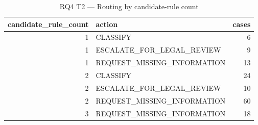 \begin{table}
\caption{RQ4 T2 — Routing by candidate-rule count}
\label{tab:rq4_t2_routing_by_rule_count}
\begin{tabular}{rlr}
\toprule
candidate\_rule\_count & action & cases \\
\midrule
1 & CLASSIFY & 6 \\
1 & ESCALATE\_FOR\_LEGAL\_REVIEW & 9 \\
1 & REQUEST\_MISSING\_INFORMATION & 13 \\
2 & CLASSIFY & 24 \\
2 & ESCALATE\_FOR\_LEGAL\_REVIEW & 10 \\
2 & REQUEST\_MISSING\_INFORMATION & 60 \\
3 & REQUEST\_MISSING\_INFORMATION & 18 \\
\bottomrule
\end{tabular}
\end{table}
